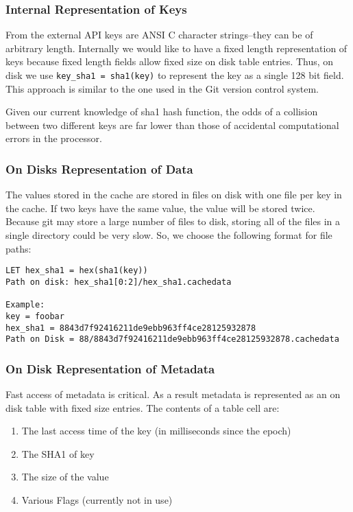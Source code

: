 \documentclass{article}
\begin{document}
\subsubsection{Internal Representation of Keys}
From the external API keys are ANSI C character strings--they can be of arbitrary length. Internally we would like to have a fixed length representation of keys because fixed length fields allow fixed size on disk table entries. Thus, on disk we use \verb|key_sha1 = sha1(key)| to represent the key as a single  128 bit field. This approach is similar to the one used in the Git version control system.

Given our current knowledge of sha1 hash function, the odds of a collision between two different keys are far lower than those of  accidental computational errors in the processor.

\subsubsection{On Disks Representation of Data}
The values stored in the cache are stored in files on disk with one file per key in the cache. If two keys have the same value, the value will be stored twice. Because git may store a large number of files to disk, storing all of the files in a single directory could be very slow. So, we choose the following format for file paths:

\begin{verbatim}
LET hex_sha1 = hex(sha1(key))
Path on disk: hex_sha1[0:2]/hex_sha1.cachedata

Example: 
key = foobar
hex_sha1 = 8843d7f92416211de9ebb963ff4ce28125932878
Path on Disk = 88/8843d7f92416211de9ebb963ff4ce28125932878.cachedata
\end{verbatim}

\subsubsection{On Disk Representation of Metadata}
Fast access of metadata is critical. As a result metadata is represented as an on disk table with fixed size entries. The contents of a table cell are: 
\begin{enumerate}
\item The last access time of the key (in milliseconds since the epoch)
\item The SHA1 of key
\item The size of the value
\item Various Flags (currently not in use)
\end{enumerate}
\end{document}
